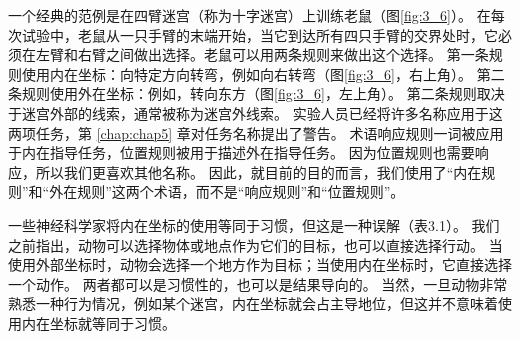 一个经典的范例是在四臂迷宫（称为十字迷宫）上训练老鼠（图\ref{fig:3_6}）。
在每次试验中，老鼠从一只手臂的末端开始，当它到达所有四只手臂的交界处时，它必须在左臂和右臂之间做出选择。老鼠可以用两条规则来做出这个选择。
第一条规则使用内在坐标：向特定方向转弯，例如向右转弯（图\ref{fig:3_6}，右上角）。
第二条规则使用外在坐标：例如，转向东方（图\ref{fig:3_6}，左上角）。
第二条规则取决于迷宫外部的线索，通常被称为迷宫外线索。
实验人员已经将许多名称应用于这两项任务，第 \ref{chap:chap5} 章对任务名称提出了警告。
术语响应规则一词被应用于内在指导任务，位置规则被用于描述外在指导任务。
因为位置规则也需要响应，所以我们更喜欢其他名称。
因此，就目前的目的而言，我们使用了“内在规则”和“外在规则”这两个术语，而不是“响应规则”和“位置规则”。\par


一些神经科学家将内在坐标的使用等同于习惯，但这是一种误解（表3.1）。
我们之前指出，动物可以选择物体或地点作为它们的目标，也可以直接选择行动。
当使用外部坐标时，动物会选择一个地方作为目标；当使用内在坐标时，它直接选择一个动作。
两者都可以是习惯性的，也可以是结果导向的。
当然，一旦动物非常熟悉一种行为情况，例如某个迷宫，内在坐标就会占主导地位，但这并不意味着使用内在坐标就等同于习惯。\par


